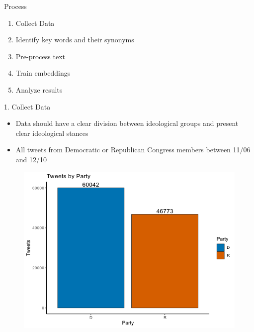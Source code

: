\documentclass[10pt]{beamer}
\begin{document}
\begin{frame}{Process}
    \begin{enumerate}
        \item Collect Data
        \item Identify key words and their synonyms
        \item Pre-process text
        \item Train embeddings
        \item Analyze results
    \end{enumerate}{}
\end{frame}

\begin{frame}{1. Collect Data}
  \begin{itemize}
      \item Data should have a clear division between ideological groups and present clear ideological stances
      \item All tweets from Democratic or Republican Congress members between 11/06 and 12/10
  \end{itemize}
    \begin{figure}
        \centering
        \includegraphics[scale=.5]{tweetcount}
    \end{figure}
\end{frame}
\end{document}
